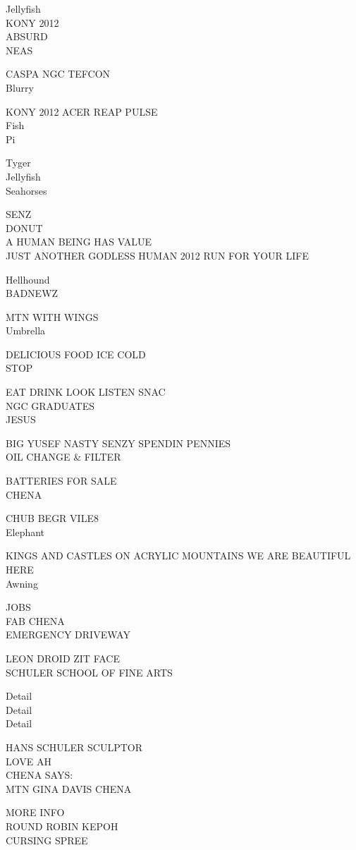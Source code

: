 \documentclass[10pt,letterpaper]{article}
\begin{document}
Jellyfish\\
KONY 2012\\
ABSURD\\
NEAS

CASPA NGC TEFCON\\
Blurry

KONY 2012 ACER REAP PULSE\\
Fish\\
Pi

Tyger\\
Jellyfish\\
Seahorses

SENZ\\
DONUT\\
A HUMAN BEING HAS VALUE\\
JUST ANOTHER GODLESS HUMAN 2012 RUN FOR YOUR LIFE

Hellhound\\
BADNEWZ

MTN WITH WINGS\\
Umbrella

DELICIOUS FOOD ICE COLD\\
STOP

EAT DRINK LOOK LISTEN SNAC\\
NGC GRADUATES\\
JESUS

BIG YUSEF NASTY SENZY SPENDIN PENNIES\\
OIL CHANGE \& FILTER

BATTERIES FOR SALE\\
CHENA

CHUB BEGR VILE8\\
Elephant

KINGS AND CASTLES ON ACRYLIC MOUNTAINS WE ARE BEAUTIFUL HERE\\
Awning

JOBS\\
FAB CHENA\\
EMERGENCY DRIVEWAY

LEON DROID ZIT FACE\\
SCHULER SCHOOL OF FINE ARTS

Detail\\
Detail\\
Detail

HANS SCHULER SCULPTOR\\
LOVE AH\\
CHENA SAYS:\\
MTN GINA DAVIS CHENA

MORE INFO\\
ROUND ROBIN KEPOH\\
CURSING SPREE
\end{document}
